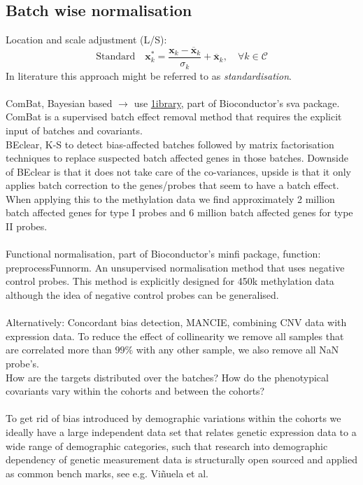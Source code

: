 \documentclass[a4paper,10pt]{article}
\begin{document}
\subsection{Batch wise normalisation}
%
Location and scale adjustment (L/S):
\begin{equation}
\mbox{Standard}\quad \mathbf{x}^*_k= \frac{\mathbf{x}_k-\overline{\mathbf{x}}_k}{\sigma_k} + \overline{\mathbf{x}}_k,\quad \forall k\in \mathcal{C}
\end{equation}
%
In literature this approach might be referred to as \textit{standardisation}. \\ \\
%
ComBat, Bayesian based $\rightarrow$ use \href{http://www.bu.edu/jlab/wp-assets/ComBat/Abstract.html}{1ibrary}, part of Bioconductor's sva package. ComBat is a supervised batch effect removal method that requires the explicit input of batches and covariants.\\
%
BEclear, K-S to detect bias-affected batches followed by matrix factorisation techniques to replace suspected batch affected genes in those batches. Downside of BEclear is that it does not take care of the co-variances, upside is that it only applies batch correction to the genes/probes that seem to have a batch effect. When applying this to the methylation data we find approximately 2 million batch affected genes for type I probes and 6 million batch affected genes for type II probes. \\ \\
% 
Functional normalisation, part of Bioconductor's minfi package, function: preprocessFunnorm. An unsupervised 
normalisation method that uses negative control probes. This method is explicitly designed for 450k methylation
data although the idea of negative control probes can be generalised. \\ \\
% 
Alternatively: Concordant bias detection, MANCIE, combining CNV data with expression data.
%
To reduce the effect of collinearity we remove all samples that are correlated more than $99\%$ with 
any other sample, we also remove all NaN probe's. \\ 
%
How are the targets distributed over the batches? How do the phenotypical covariants vary within the 
cohorts and between the cohorts? \\ \\
%
To get rid of bias introduced by demographic variations within the cohorts we ideally have a large
independent data set that relates genetic expression data to a wide range of demographic categories, such that research into
demographic dependency of genetic measurement data is structurally open sourced and applied as common bench marks, see e.g. 
Vi\~{n}uela et al\cite{Vinuela2018}.
%
\end{document}
